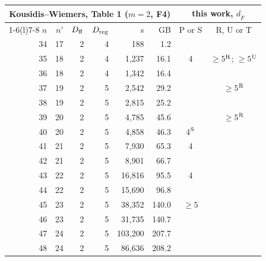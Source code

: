 \begin{tabular}{@{}rrrrrrcc@{}}
\toprule
\multicolumn{6}{c}{Kousidis--Wiemers, Table 1 ($m=2$, F4)} & \multicolumn{2}{c}{this work, $d_{\tilde F}$} \\
\cmidrule(r){1-6}\cmidrule(l){7-8}
$n$ & $n'$ & $D_{\rm ff}$ & $D_{\rm reg}$ & s & GB & P or S & R, U or T \\
\midrule
34 & 17 & 2 & 4 & 188 & 1.2 &  &  \\
35 & 18 & 2 & 4 & 1{,}237 & 16.1 & 4 & $\ge5$$^{\rm R}$; $\ge5$$^{\rm U}$ \\
36 & 18 & 2 & 4 & 1{,}342 & 16.4 &  &  \\
37 & 19 & 2 & 5 & 2{,}542 & 29.2 &  & $\ge5$$^{\rm R}$ \\
38 & 19 & 2 & 5 & 2{,}815 & 25.2 &  &  \\
39 & 20 & 2 & 5 & 4{,}785 & 45.6 &  & $\ge5$$^{\rm R}$ \\
40 & 20 & 2 & 5 & 4{,}858 & 46.3 & 4$^{\rm S}$ &  \\
41 & 21 & 2 & 5 & 7{,}930 & 65.3 & 4 &  \\
42 & 21 & 2 & 5 & 8{,}901 & 66.7 &  &  \\
43 & 22 & 2 & 5 & 16{,}816 & 95.5 & 4 &  \\
44 & 22 & 2 & 5 & 15{,}690 & 96.8 &  &  \\
45 & 23 & 2 & 5 & 38{,}352 & 140.0 & $\ge5$ &  \\
46 & 23 & 2 & 5 & 31{,}735 & 140.7 &  &  \\
47 & 24 & 2 & 5 & 103{,}200 & 207.7 &  &  \\
48 & 24 & 2 & 5 & 86{,}636 & 208.2 &  &  \\
\bottomrule
\end{tabular}
